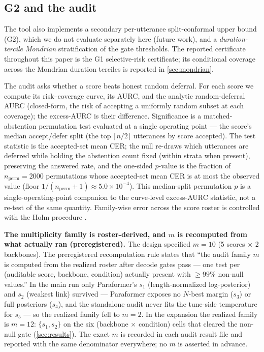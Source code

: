 \documentclass[11pt]{article}
\begin{document}
\subsection{G2 and the audit}\label{sec:audit}

The tool also implements a secondary per-utterance split-conformal upper bound (G2),
which we do not evaluate separately here (future work), and a \emph{duration-tercile
Mondrian} stratification of the gate thresholds. The reported certificate throughout
this paper is the G1 selective-risk certificate; its conditional coverage across the
Mondrian duration terciles is reported in \cref{sec:mondrian}.

The audit asks whether a score beats honest random deferral. For each score
we compute its risk--coverage curve, its AURC, and the analytic random-deferral
AURC (closed-form, the risk of accepting a uniformly random subset at each coverage);
the excess-AURC is their difference. Significance is a matched-abstention permutation
test evaluated at a single operating point --- the score's median accept/defer split
(the top $\lceil n/2\rceil$ utterances by score accepted). The test statistic is the
accepted-set mean CER; the null re-draws which utterances are deferred while holding the
abstention count fixed (within strata when present), preserving the answered rate, and
the one-sided $p$-value is the fraction of $n_{\mathrm{perm}}=2000$ permutations whose
accepted-set mean CER is at most the observed value (floor
$1/(n_{\mathrm{perm}}{+}1)\approx5.0\times10^{-4}$). This median-split permutation $p$ is
a single-operating-point companion to the curve-level excess-AURC statistic, not a
re-test of the same quantity. Family-wise error across the score roster is controlled
with the Holm procedure \citep{holm1979simple}.

\textbf{The multiplicity family is roster-derived, and $m$ is recomputed from what
actually ran (preregistered).} The design specified $m=10$ (5 scores $\times$ 2
backbones). The preregistered recomputation rule states that ``the audit family $m$
is computed from the realized roster after decode gates pass --- one test per
(auditable score, backbone, condition) actually present with $\ge99\%$ non-null
values.'' In the main run only Paraformer's $s_1$ (length-normalized log-posterior)
and $s_2$ (weakest link) survived --- Paraformer exposes no $N$-best margin ($s_3$) or
full posteriors ($s_4$), and the standalone audit never fits the tune-side temperature
for $s_5$ --- so the realized family fell to $m=2$. In the expansion the realized
family is $m=12$: $\{s_1,s_2\}$ on the six (backbone $\times$ condition) cells that
cleared the non-null gate (\cref{sec:results}). The exact $m$ is recorded in each
audit result file and reported with the same denominator everywhere; no $m$ is asserted
in advance.
\end{document}
